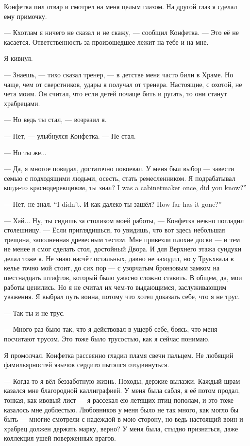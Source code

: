 Конфетка пил отвар и смотрел на меня целым глазом.
На другой глаз я сделал ему примочку.

--- Кхотлам я ничего не сказал и не скажу, --- сообщил Конфетка.
--- Это её не касается.
Ответственность за произошедшее лежит на тебе и на мне.

Я кивнул.

--- Знаешь, --- тихо сказал тренер, --- в детстве меня часто били в Храме.
Но чаще, чем от сверстников, удары я получал от тренера.
Настоящие, с охотой, не чета моим.
Он считал, что если детей почаще бить и ругать, то они станут храбрецами.

--- Но ведь ты стал, --- возразил я.

--- Нет, --- улыбнулся Конфетка.
--- Не стал.

--- Но ты же...

--- Да, я многое повидал, достаточно повоевал.
У меня был выбор --- завести семью с подходящими людьми, осесть, стать ремесленником.
{Я подрабатывал когда-то краснодеревщиком, ты знал?}
{I was a cabinetmaker once, did you know?''}

{--- Нет, не знал.}
{``I didn't.}
{И как далеко ты зашёл?}
{How far has it gone?''}

--- Хай...
Ну, ты сидишь за столиком моей работы, --- Конфетка нежно погладил столешницу.
--- Если приглядишься, то увидишь, что вот здесь небольшая трещина, заполненная древесным тестом.
Мне привезли плохие доски --- и тем не менее я смог сделать стол, достойный Двора.
И для Верхнего этажа сундуки делал тоже я.
Не знаю насчёт остальных, давно не заходил, но у Трукхвала в келье точно мой стоит, до сих пор --- с узорчатым бронзовым замком на шестнадцать штифтов, который было ужасно сложно ставить.
В общем, да, мои работы ценились.
Но я не считал их чем-то выдающимся, заслуживающим уважения.
Я выбрал путь воина, потому что хотел доказать себе, что я не трус.

--- Так ты и не трус.

--- Много раз было так, что я действовал в ущерб себе, боясь, что меня посчитают трусом.
Это тоже было трусостью, как я сейчас понимаю.

Я промолчал.
Конфетка рассеянно гладил пламя свечи пальцем.
Не любящий фамильярностей язычок сердито пытался отодвинуться.

--- Когда-то я вёл беззаботную жизнь.
Походы, дерзкие вылазки.
Каждый шрам казался мне благородной каллиграфией.
У меня была сабля, я её потом продал, тонкая, как ивовый лист --- я рассекал ею летящих птиц пополам, и это тоже казалось мне доблестью.
Любовников у меня было не так много, как могло бы быть --- многие смотрели с надеждой в мою сторону, но ведь настоящий воин и храбрец должен держать марку, верно?
У меня была, стыдно признаться, даже коллекция ушей поверженных врагов.

